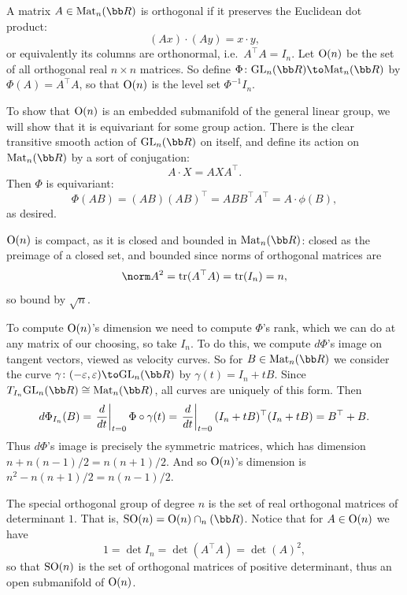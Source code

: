 \eproof

\bexam

    A matrix $A\in\mat_n(\bR)$ is {\emphcolor orthogonal} if it preserves the Euclidean dot product:
    $$ (Ax)\cdot(Ay) = x\cdot y , $$
    or equivalently its columns are orthonormal, i.e.\ $A^\top A=I_n$.
    Let ${\rm O}(n)$ be the set of all orthogonal real $n\times n$ matrices.
    So define $\Phi\colon\gl_n(\bR)\to\mat_n(\bR)$ by $\Phi(A)=A^\top A$, so that ${\rm O}(n)$ is the level set $\Phi^{-1}I_n$.

    To show that ${\rm O}(n)$ is an embedded submanifold of the general linear group, we will show that it is equivariant for some group action.
    There is the clear transitive smooth action of $\gl_n(\bR)$ on itself, and define its action on $\mat_n(\bR)$ by a sort of conjugation:
    $$ A\cdot X = AXA^\top . $$
    Then $\Phi$ is equivariant:
    $$ \Phi(AB) = (AB)(AB)^\top = ABB^\top A^\top = A\cdot\phi(B) , $$
    as desired.

    ${\rm O}(n)$ is compact, as it is closed and bounded in $\mat_n(\bR)$: closed as the preimage of a closed set, and bounded since norms of
    orthogonal matrices are
    $$ \norm A^2 = \trace(A^\top A) = \trace(I_n) = n , $$
    so bound by $\sqrt n$.

    To compute ${\rm O}(n)$'s dimension we need to compute $\Phi$'s rank, which we can do at any matrix of our choosing, so take $I_n$.
    To do this, we compute $d\Phi$'s image on tangent vectors, viewed as velocity curves.
    So for $B\in\mat_n(\bR)$ we consider the curve $\gamma\colon(-\epsilon,\epsilon)\to\gl_n(\bR)$ by $\gamma(t)=I_n+tB$.
    Since $T_{I_n}\gl_n(\bR)\cong\mat_n(\bR)$, all curves are uniquely of this form.
    Then
    $$ d\Phi_{I_n}(B) = \left.{{d}\over{dt}}\right|_{t=0}\Phi\circ\gamma(t) = \left.{{d}\over{dt}}\right|_{t=0}(I_n+tB)^\top(I_n+tB) = B^\top + B . $$
    Thus $d\Phi$'s image is precisely the symmetric matrices, which has dimension $n+n(n-1)/2=n(n+1)/2$.
    And so ${\rm O}(n)$'s dimension is $n^2-n(n+1)/2=n(n-1)/2$.

\eexam

\bexam

    The {\emphcolor special orthogonal group} of degree $n$ is the set of real orthogonal matrices of determinant $1$.
    That is, $\sorth(n)=\orth(n)\cap\sl_n(\bR)$.
    Notice that for $A\in{\rm O}(n)$ we have
    $$ 1 = \det I_n = \det(A^\top A) = \det(A)^2 , $$
    so that ${\rm SO}(n)$ is the set of orthogonal matrices of positive determinant, thus an open submanifold of ${\rm O}(n)$.

